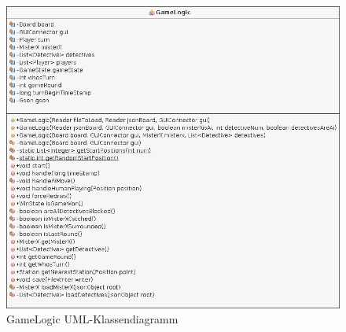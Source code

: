         \begin{figure}[H]
            \centering
            \includegraphics[scale=0.5]{img/uml/gameLogic.png}   
            \caption{GameLogic UML-Klassendiagramm}
        \end{figure}


